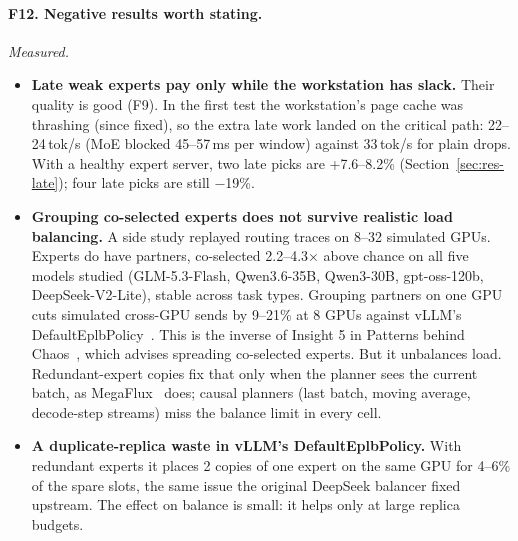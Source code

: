 \documentclass[11pt]{article}
\newcommand{\tps}{\,tok/s}
\newcommand{\ms}{\,ms}
\newcommand{\finding}[2]{\paragraph{#1}\emph{#2}\ }
\begin{document}
\finding{F12. Negative results worth stating.}{Measured.}
\begin{itemize}
  \item \textbf{Late weak experts pay only while the workstation has slack.} Their quality is good (F9). In the first
    test the workstation's page cache was thrashing (since fixed), so the extra late work landed on the critical path:
    22--24\tps{} (MoE blocked 45--57\ms{} per window) against 33\tps{} for plain drops. With a healthy expert server,
    two late picks are +7.6--8.2\% (Section~\ref{sec:res-late}); four late picks are still $-$19\%.
  \item \textbf{Grouping co-selected experts does not survive realistic load balancing.} A side study replayed routing
    traces on 8--32 simulated GPUs. Experts do have partners, co-selected 2.2--4.3$\times$ above chance on all five
    models studied (GLM-5.3-Flash, Qwen3.6-35B, Qwen3-30B, gpt-oss-120b, DeepSeek-V2-Lite), stable across task types.
    Grouping partners on one GPU cuts simulated cross-GPU sends by 9--21\% at 8 GPUs against vLLM's
    DefaultEplbPolicy~\citep{eplb}. This is the inverse of Insight 5 in Patterns behind Chaos~\citep{chaos}, which
    advises spreading co-selected experts. But it unbalances load. Redundant-expert copies fix that only when the planner
    sees the current batch, as MegaFlux~\citep{megaflux} does; causal planners (last batch, moving average, decode-step
    streams) miss the balance limit in every cell.
  \item \textbf{A duplicate-replica waste in vLLM's DefaultEplbPolicy.} With redundant experts it places 2 copies of one
    expert on the same GPU for 4--6\% of the spare slots, the same issue the original DeepSeek balancer fixed upstream.
    The effect on balance is small: it helps only at large replica budgets.
\end{itemize}
\end{document}
